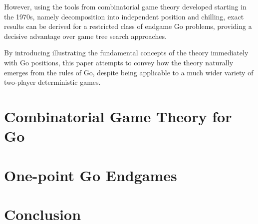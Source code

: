 \documentclass{article}
\theoremstyle{plain}
\theoremstyle{definition}
\begin{document}
However, using the tools from combinatorial game theory developed starting in the 1970s,
namely decomposition into independent position and chilling, exact results can be derived
for a restricted class of endgame Go problems, providing a decisive advantage over 
game tree search approaches.

By introducing illustrating the fundamental concepts of the theory immediately 
with Go positions, this paper attempts to convey how the theory naturally emerges from the rules 
of Go, despite being applicable to a much wider variety of two-player deterministic
games. 



\section{Combinatorial Game Theory for Go}







\section{One-point Go Endgames}







\section{Conclusion}




\end{document}

